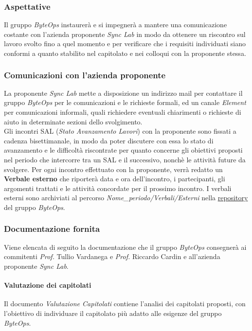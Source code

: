 \subsubsection{Aspettative}
Il gruppo \textit{ByteOps} instaurerà e si impegnerà a mantere una comunicazione costante con l'azienda proponente \textit{Sync Lab} in modo da ottenere un riscontro sul lavoro svolto fino a quel momento e per verificare che i requisiti individuati siano conformi a quanto stabilito nel capitolato e nei colloqui con la proponente stessa.\\

\subsubsection{Comunicazioni con l'azienda proponente}
La proponente \textit{Sync Lab} mette a disposizione un indirizzo mail per contattare il gruppo \textit{ByteOps} per le comunicazioni e le richieste formali, ed un canale \textit{Element} per comunicazioni informali, quali richiedere eventuali chiarimenti o richieste di aiuto in determinate sezioni dello svolgimento.\\
Gli incontri SAL (\textit{Stato Avanzamento Lavori}) con la proponente sono fissati a cadenza bisettimanale, in modo da poter discutere con essa lo stato di avanzamento e le difficoltà riscontrate per quanto concerne gli obiettivi proposti nel periodo che intercorre tra un SAL e il successivo, nonchè le attività future da svolgere.
Per ogni incontro effettuato con la proponente, verrà redatto un \textbf{Verbale esterno} che riporterà data e ora dell'incontro, i partecipanti, gli argomenti trattati e le attività concordate per il prossimo incontro.
I verbali esterni sono archiviati al percorso \textit{Nome\_periodo/Verbali/Esterni} nella \href{https://github.com/ByteOps-swe/Documents}{repository} del gruppo \textit{ByteOps}.

\subsubsection {Documentazione fornita}
Viene elencata di seguito la documentazione che il gruppo \textit{ByteOps} consegnerà ai commitenti \textit{Prof.} Tullio Vardanega e \textit{Prof.} Riccardo Cardin e all'azienda proponente \textit{Sync Lab}.

\paragraph{Valutazione dei capitolati}
Il documento \textit{Valutazione Capitolati} contiene l'analisi dei capitolati proposti, con l'obiettivo di individuare il capitolato più adatto alle esigenze del gruppo \textit{ByteOps}.

